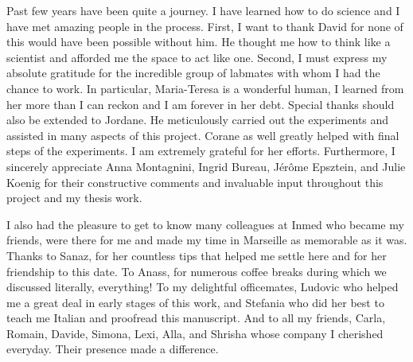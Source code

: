 Past few years have been quite a journey.
I have learned how to do science and I have met amazing people in the process.
First, I want to thank David for none of this would have been possible without him.
He thought me how to think like a scientist and afforded me the space to act like one.
Second, I must express my absolute gratitude for the incredible group of labmates with whom I had the chance to work.
In particular, Maria-Teresa is a wonderful human, I learned from her more than I can reckon and I am forever in her debt.
Special thanks should also be extended to Jordane.
He meticulously carried out the experiments and assisted in many aspects of this project.
Corane as well greatly helped with final steps of the experiments.
I am extremely grateful for her efforts.
Furthermore, I sincerely appreciate Anna Montagnini, Ingrid Bureau, J\'{e}r\^{o}me Epsztein, and Julie Koenig for their constructive comments and invaluable input throughout this project and my thesis work.
\par
I also had the pleasure to get to know many colleagues at Inmed who became my friends, were there for me and made my time in Marseille as memorable as it was.
Thanks to Sanaz, for her countless tips that helped me settle here and for her friendship to this date.
To Anass, for numerous coffee breaks during which we discussed literally, everything!
To my delightful officemates, Ludovic who helped me a great deal in early stages of this work, and Stefania who did her best to teach me Italian and proofread this manuscript.
And to all my friends, Carla, Romain, Davide, Simona, Lexi, Alla, and Shrisha whose company I cherished everyday.
Their presence made a difference.